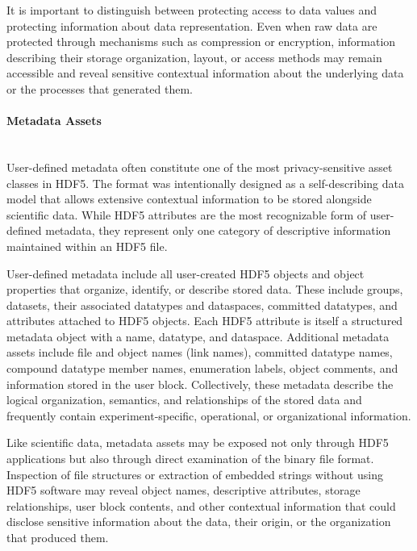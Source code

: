 \documentclass[../main.tex]{subfiles}
\begin{document}
It is important to distinguish between protecting access to data values and protecting 
information about data representation. Even when raw data are protected through mechanisms 
such as compression or encryption, information describing their storage organization, layout, 
or access methods may remain accessible and reveal sensitive contextual information about 
the underlying data or the processes that generated them.


\paragraph{Metadata Assets}\mbox{}\\
User-defined metadata often constitute one of the most privacy-sensitive asset classes in HDF5. 
The format was intentionally designed as a self-describing data model that allows extensive 
contextual information to be stored alongside scientific data. While HDF5 attributes are the most 
recognizable form of user-defined metadata, they represent only one category of descriptive 
information maintained within an HDF5 file.

User-defined metadata include all user-created HDF5 objects and object properties that organize, 
identify, or describe stored data. These include groups, datasets, their associated datatypes 
and dataspaces, committed datatypes, and attributes attached to HDF5 objects. 
Each HDF5 attribute is itself a structured metadata object with a name, datatype, and dataspace. 
Additional metadata assets include file and object names (link names), committed datatype names, 
compound datatype member names, enumeration labels, object comments, and information 
stored in the user block. Collectively, these metadata describe the logical organization, 
semantics, and relationships of the stored data and frequently contain experiment-specific, 
operational, or organizational information.

Like scientific data, metadata assets may be exposed not only through HDF5 applications but 
also through direct examination of the binary file format. Inspection of file structures or 
extraction of embedded strings without using HDF5 software may reveal object names, 
descriptive attributes, storage relationships, user block contents, and other contextual 
information that could disclose sensitive information about the data, their origin, 
or the organization that produced them.
\end{document}
